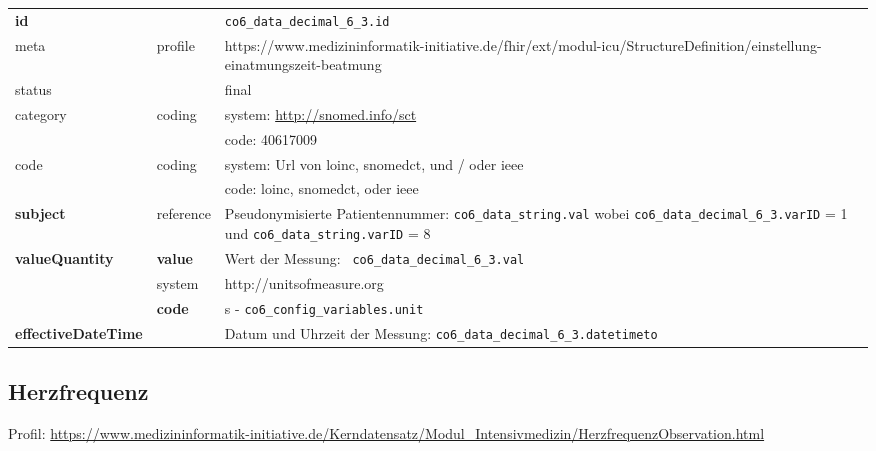 \begin{longtable}{|l|l|p{7.5cm}|}
        \hline
        \rowcolor{lightgray} \multicolumn{3}{|l|}{Data Mapping (inhaltlich)} \\ \hline
        \textbf{id} &  & \texttt{co6\_data\_decimal\_6\_3.id} \\ \hline
	meta & profile & https://www.medizininformatik-initiative.de/fhir/ext/modul-icu/StructureDefinition/einstellung-einatmungszeit-beatmung \\ \hline 
	status &  & final   \\ \hline 
	category & coding & system: \url{http://snomed.info/sct} \\
\cline{3-3}
	& & code: 40617009\\ \hline
	code & coding & system: Url von \ac{loinc}, \ac{snomedct}, und / oder \ac{ieee} \\ 
	\cline{3-3} 
	 &  & code: \ac{loinc}, \ac{snomedct}, oder \ac{ieee} \\ \hline
	 \textbf{subject} & reference & Pseudonymisierte Patientennummer: \texttt{co6\_data\_string.val} wobei \texttt{co6\_data\_decimal\_6\_3.varID} = 1 und \texttt{co6\_data\_string.varID} = 8 \\ \hline
	 \textbf{valueQuantity}  & \textbf{value} & Wert der Messung: \texttt{
co6\_data\_decimal\_6\_3.val} \\
        \cline{2-3}
         & system & http://unitsofmeasure.org \\
         \cline{2-3}
         & \textbf{code} & s - \texttt{co6\_config\_variables.unit} \\ \hline
     \textbf{effectiveDateTime}  & & Datum und Uhrzeit der Messung: \texttt{co6\_data\_decimal\_6\_3.datetimeto} \\ \hline
\end{longtable}

\subsection{Herzfrequenz} 

Profil: \url{https://www.medizininformatik-initiative.de/Kerndatensatz/Modul_Intensivmedizin/HerzfrequenzObservation.html}

